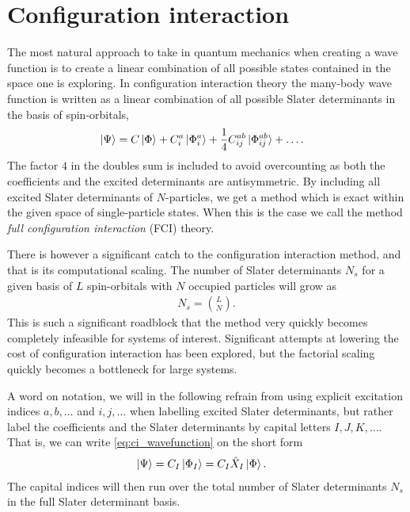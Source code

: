 \chapter{Configuration interaction}
    \label{chap:ci}
    The most natural approach to take in quantum mechanics when creating a wave
    function is to create a linear combination of all possible states contained
    in the space one is exploring.
    In configuration interaction theory the many-body wave function is written
    as a linear combination of all possible Slater determinants in the basis of
    spin-orbitals,
    \begin{align}
        \ket*{\Psi}
        &= C\ket*{\Phi}
        + C^a_i\ket*{\Phi^{a}_{i}}
        + \frac{1}{4}C^{ab}_{ij}\ket*{\Phi^{ab}_{ij}}
        + \dots.
        \label{eq:ci_wavefunction}
    \end{align}
    The factor $4$ in the doubles sum is included to avoid overcounting as both
    the coefficients and the excited determinants are antisymmetric.
    By including all excited Slater determinants of $N$-particles, we get a
    method which is exact within the given space of single-particle states.
    When this is the case we call the method \emph{full configuration
    interaction} (FCI) theory.

    There is however a significant catch to the configuration interaction
    method, and that is its computational scaling.
    The number of Slater determinants $N_{s}$ for a given basis of $L$
    spin-orbitals with $N$ occupied particles will grow as \cite{kvaal2017notes}
    \begin{align}
        N_{s} = \binom{L}{N}.
    \end{align}
    This is such a significant roadblock that the method very quickly becomes
    completely infeasible for systems of interest.
    Significant attempts at lowering the cost of configuration interaction has
    been explored, but the factorial scaling quickly becomes a bottleneck for
    large systems.

    A word on notation, we will in the following refrain from using explicit
    excitation indices $a, b, \dots$ and $i, j, \dots$ when labelling excited
    Slater determinants, but rather label the coefficients and the Slater
    determinants by capital letters $I, J, K, \dots$.
    That is, we can write \autoref{eq:ci_wavefunction} on the short form
    \begin{align}
        \ket*{\Psi}
        &= C_{I}\ket*{\Phi_I}
        = C_{I}\hat{X}_I\ket*{\Phi}.
    \end{align}
    The capital indices will then run over the total number of Slater
    determinants $N_s$ in the full Slater determinant basis.

